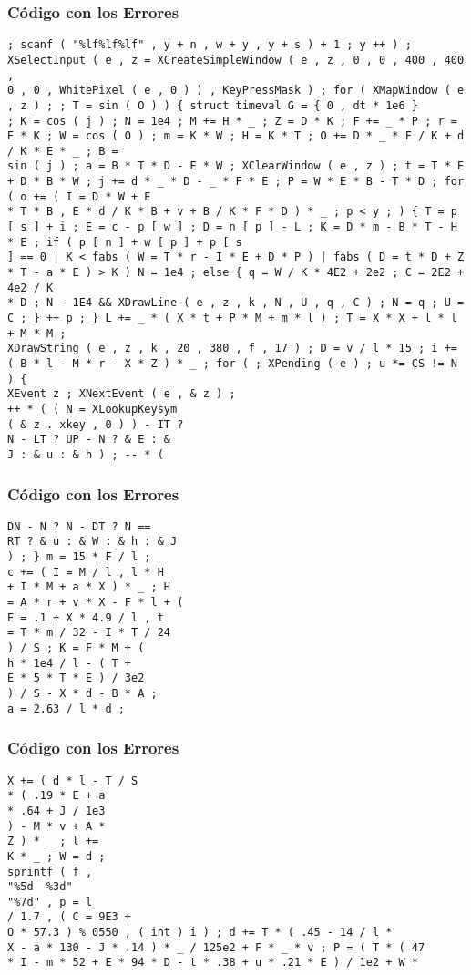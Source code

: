 \documentclass{beamer}
\begin{document}
\begin{frame}[fragile]
\frametitle{C\'odigo con los Errores}
\begin{verbatim}
; scanf ( "%lf%lf%lf" , y + n , w + y , y + s ) + 1 ; y ++ ) ; XSelectInput ( e , z = XCreateSimpleWindow ( e , z , 0 , 0 , 400 , 400 , 
0 , 0 , WhitePixel ( e , 0 ) ) , KeyPressMask ) ; for ( XMapWindow ( e , z ) ; ; T = sin ( O ) ) { struct timeval G = { 0 , dt * 1e6 } 
; K = cos ( j ) ; N = 1e4 ; M += H * _ ; Z = D * K ; F += _ * P ; r = E * K ; W = cos ( O ) ; m = K * W ; H = K * T ; O += D * _ * F / K + d / K * E * _ ; B = 
sin ( j ) ; a = B * T * D - E * W ; XClearWindow ( e , z ) ; t = T * E + D * B * W ; j += d * _ * D - _ * F * E ; P = W * E * B - T * D ; for ( o += ( I = D * W + E 
* T * B , E * d / K * B + v + B / K * F * D ) * _ ; p < y ; ) { T = p [ s ] + i ; E = c - p [ w ] ; D = n [ p ] - L ; K = D * m - B * T - H * E ; if ( p [ n ] + w [ p ] + p [ s 
] == 0 | K < fabs ( W = T * r - I * E + D * P ) | fabs ( D = t * D + Z * T - a * E ) > K ) N = 1e4 ; else { q = W / K * 4E2 + 2e2 ; C = 2E2 + 4e2 / K 
* D ; N - 1E4 && XDrawLine ( e , z , k , N , U , q , C ) ; N = q ; U = C ; } ++ p ; } L += _ * ( X * t + P * M + m * l ) ; T = X * X + l * l + M * M ; 
XDrawString ( e , z , k , 20 , 380 , f , 17 ) ; D = v / l * 15 ; i += ( B * l - M * r - X * Z ) * _ ; for ( ; XPending ( e ) ; u *= CS != N ) { 
XEvent z ; XNextEvent ( e , & z ) ; 
++ * ( ( N = XLookupKeysym 
( & z . xkey , 0 ) ) - IT ? 
N - LT ? UP - N ? & E : & 
J : & u : & h ) ; -- * ( 
\end{verbatim}
\end{frame}
\begin{frame}[fragile]
\frametitle{C\'odigo con los Errores}
\begin{verbatim}
DN - N ? N - DT ? N == 
RT ? & u : & W : & h : & J 
) ; } m = 15 * F / l ; 
c += ( I = M / l , l * H 
+ I * M + a * X ) * _ ; H 
= A * r + v * X - F * l + ( 
E = .1 + X * 4.9 / l , t 
= T * m / 32 - I * T / 24 
) / S ; K = F * M + ( 
h * 1e4 / l - ( T + 
E * 5 * T * E ) / 3e2 
) / S - X * d - B * A ; 
a = 2.63 / l * d ; 
\end{verbatim}
\end{frame}
\begin{frame}[fragile]
\frametitle{C\'odigo con los Errores}
\begin{verbatim}
X += ( d * l - T / S 
* ( .19 * E + a 
* .64 + J / 1e3 
) - M * v + A * 
Z ) * _ ; l += 
K * _ ; W = d ; 
sprintf ( f , 
"%5d  %3d" 
"%7d" , p = l 
/ 1.7 , ( C = 9E3 + 
O * 57.3 ) % 0550 , ( int ) i ) ; d += T * ( .45 - 14 / l * 
X - a * 130 - J * .14 ) * _ / 125e2 + F * _ * v ; P = ( T * ( 47 
* I - m * 52 + E * 94 * D - t * .38 + u * .21 * E ) / 1e2 + W * 
\end{verbatim}
\end{frame}
\end{document}
